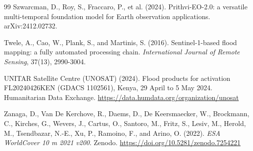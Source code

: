 \documentclass[11pt]{article}
\begin{document}
\begin{thebibliography}{99}
Szwarcman, D., Roy, S., Fraccaro, P., et al. (2024). Prithvi-EO-2.0: a
versatile multi-temporal foundation model for Earth observation applications.
arXiv:2412.02732.

Twele, A., Cao, W., Plank, S., and Martinis, S. (2016). Sentinel-1-based flood
mapping: a fully automated processing chain. \textit{International Journal of
Remote Sensing}, 37(13), 2990-3004.

UNITAR Satellite Centre (UNOSAT) (2024). Flood products for activation
FL20240426KEN (GDACS 1102561), Kenya, 29 April to 5 May 2024. Humanitarian
Data Exchange. \url{https://data.humdata.org/organization/unosat}

Zanaga, D., Van De Kerchove, R., Daems, D., De Keersmaecker, W., Brockmann, C.,
Kirches, G., Wevers, J., Cartus, O., Santoro, M., Fritz, S., Lesiv, M.,
Herold, M., Tsendbazar, N.-E., Xu, P., Ramoino, F., and Arino, O. (2022).
\textit{ESA WorldCover 10 m 2021 v200}. Zenodo.
\url{https://doi.org/10.5281/zenodo.7254221}

\end{thebibliography}
\end{document}
